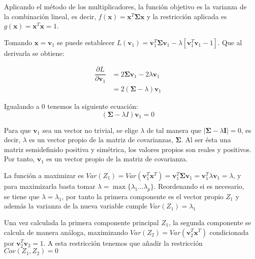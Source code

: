 \noindent Aplicando el método de los multiplicadores, la función objetivo es la varianza de la combinación lineal, es decir, $f(\mathbf{x})=\mathbf{x}^T \mathbf{\Sigma} \mathbf{x}$ y la restricción aplicada es $g(\textbf{x})=\textbf{x}^T\textbf{x}=1$. 

\noindent Tomando $\textbf{x}=\textbf{v}_1$ se puede establecer $L(\textbf{v}_1)=\textbf{v}_1^T \mathbf{\Sigma} \textbf{v}_1 - \lambda[\textbf{v}_1^T \textbf{v}_1-1]$. Que al derivarla se obtiene:

\begin{align*}
\dfrac{\partial L}{\partial \textbf{v}_1} &= 2\mathbf{\Sigma} \textbf{v}_1 - 2\lambda\textbf{v}_1\\
& = 2(\mathbf{\Sigma}-\lambda)\textbf{v}_1 
\end{align*}

\noindent Igualando a 0 tenemos la siguiente ecuación: 
\begin{equation}
(\mathbf{\Sigma}-\lambda I)\textbf{v}_1=0
\end{equation}

\noindent Para que $\textbf{v}_1$ sea un vector no trivial, se elige $\lambda$ de tal manera que $|\mathbf{\Sigma}-\lambda \mathbf{I}| = 0$, es decir, $\lambda$ es un vector propio de la matriz de covarianzas, $\mathbf{\Sigma}$. Al ser ésta una matriz semidefinido positiva y simétrica, los valores propios son reales y positivos. Por tanto, $\textbf{v}_1$ es un vector propio de la matriz de covarianza.

\noindent La función a maximizar es $Var(Z_1)=Var(\textbf{v}_1^T\textbf{x}^T)=\textbf{v}_1^T\mathbf{\Sigma} \textbf{v}_1=\textbf{v}_1^T\lambda \textbf{v}_1=\lambda$, y para maximizarla basta tomar $\lambda=\max{\lbrace\lambda_1\ldots \lambda_p\rbrace}$. Reordenando si es necesario, se tiene que $\lambda=\lambda_1$, por tanto la primera componente es el vector propio $Z_1$ y además la varianza de la nueva variable cumple $Var(Z_1)=\lambda_1$ 

\noindent Una vez calculada la primera componente principal $Z_1$, la segunda componente se calcula de manera análoga, maximizando $Var(Z_2)=Var(\textbf{v}_2^T\textbf{x}^T)$ condicionada por $\textbf{v}_2^T\textbf{v}_2=1$. A esta restricción tenemos que añadir la restricción $Cov(Z_1,Z_2)=0 $

